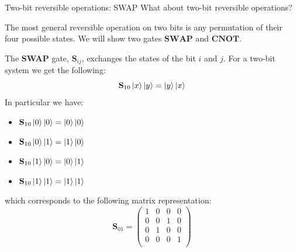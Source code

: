 \documentclass[11p,aspectratio=169]{beamer}
\begin{document}
\begin{frame}{Two-bit reversible operations: SWAP}
    What about two-bit reversible operations?

    The most general reversible operation on two bits is any permutation of their four 
    possible states. We will show two gates $\textbf{SWAP}$ and $\textbf{CNOT}$.
    \vspace{0.5cm}

    \pause
    The \textbf{SWAP} gate, $\textbf{S}_{ij}$,  exchanges the states of the bit $i$ and $j$.
    For a two-bit system we get the following:
    $$ \textbf{S}_{10} \ket{x} \ket{y} = \ket{y} \ket{x}$$
    In particular we have:
    \begin{multicols*}{2}
        \begin{itemize}{}
            \item $\textbf{S}_{10} \ket{0} \ket{0} = \ket{0} \ket{0} $
            \item $\textbf{S}_{10} \ket{0} \ket{1} = \ket{1} \ket{0} $
            \item $\textbf{S}_{10} \ket{1} \ket{0} = \ket{0} \ket{1} $
            \item $\textbf{S}_{10} \ket{1} \ket{1} = \ket{1} \ket{1} $
        \end{itemize}
    \end{multicols*}
    which corresponds to the following matrix representation:
    $$\textbf{S}_{01} = \begin{pmatrix}
        1 & 0 & 0 & 0 \\
        0 & 0 & 1 & 0 \\
        0 & 1 & 0 & 0 \\
        0 & 0 & 0 & 1 \\
    \end{pmatrix} $$
\end{frame}
\end{document}
